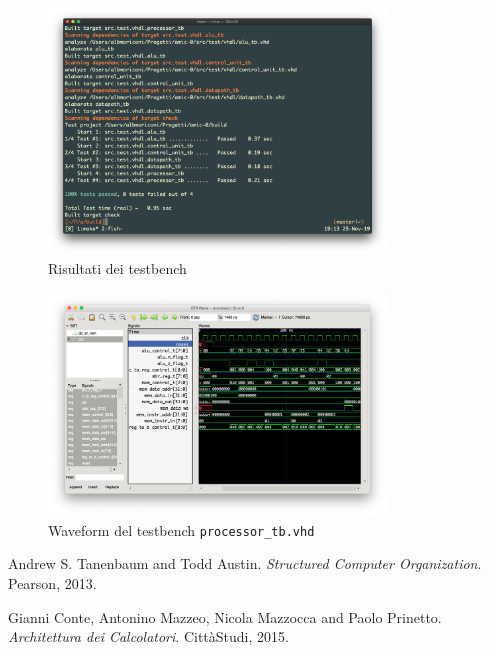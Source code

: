 \documentclass[a4paper,12pt]{scrreprt}
\begin{document}
\begin{figure}
  \centering
  \includegraphics[width=0.8\textwidth]{test.png}
  \caption{Risultati dei testbench}\label{fig:test}
\end{figure}

\begin{figure}
  \centering
  \includegraphics[width=0.8\textwidth]{waveform.png}
  \caption{Waveform del testbench \lstinline{processor_tb.vhd}}\label{fig:waveform}
\end{figure}

\begin{thebibliography}{2}
  Andrew S. Tanenbaum and Todd Austin.
  \textit{Structured Computer Organization}.
  Pearson, 2013.

  Gianni Conte, Antonino Mazzeo, Nicola Mazzocca and Paolo Prinetto.
  \textit{Architettura dei Calcolatori}.
  CittàStudi, 2015.
\end{thebibliography}
\end{document}
